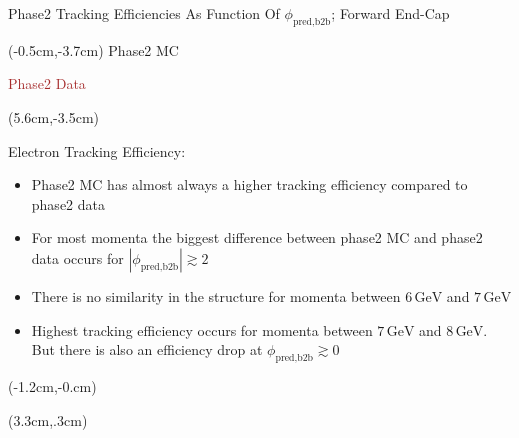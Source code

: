 \documentclass[8pt]{beamer}
\begin{document}
\begin{frame}{Phase2 Tracking Efficiencies As Function Of $\phi_{\textrm{pred,b2b}}$; Forward End-Cap}
	\begin{textblock*}{4cm}(-0.5cm,-3.7cm)
		\textcolor{OliveGreen}{Phase2 MC}
		
		\textcolor{brown}{Phase2 Data}
	\end{textblock*}
	
	
	\pause[2]
	
	\begin{textblock*}{6cm}(5.6cm,-3.5cm)
		\begin{mybox}
			Electron Tracking Efficiency:
			\begin{itemize}
				
				\item Phase2 MC has almost always a higher tracking efficiency compared to phase2 data
				\item For most momenta the biggest difference between phase2 MC and phase2 data occurs for $|\phi_{\textrm{pred,b2b}}| \gtrsim 2$
				
				\item<3-> There is no similarity in the structure for momenta between $6\,\textrm{GeV}$ and $7\,\textrm{GeV}$
				\item<4-> Highest tracking efficiency occurs for momenta between $7\,\textrm{GeV}$ and $8\,\textrm{GeV}$. But there is also an efficiency drop at $\phi_{\textrm{pred,b2b}} \gtrsim 0$
			\end{itemize}
		\end{mybox}
	\end{textblock*}
	\pause[3]
	\begin{textblock*}{5cm}(-1.2cm,-0.cm)
	\end{textblock*}
	
	\begin{textblock*}{5cm}(3.3cm,.3cm)
	\end{textblock*}
	
	
	\pause[5]
	
	
\end{frame}
\end{document}
